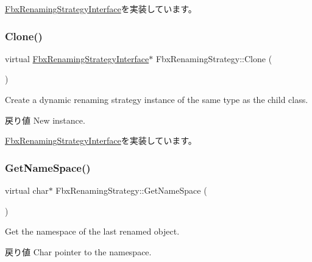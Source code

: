 \hyperlink{class_fbx_renaming_strategy_interface_a2090b5ae43936b617ec5d75015923f69}{Fbx\+Renaming\+Strategy\+Interface}を実装しています。

\mbox{\label{class_fbx_renaming_strategy_a36d1f3cc01ea460ab97d95fc8d8dd136}} 
\subsubsection{\texorpdfstring{Clone()}{Clone()}}
{\footnotesize\ttfamily virtual \hyperlink{class_fbx_renaming_strategy_interface}{Fbx\+Renaming\+Strategy\+Interface}$\ast$ Fbx\+Renaming\+Strategy\+::\+Clone (\begin{DoxyParamCaption}{ }\end{DoxyParamCaption})\hspace{0.3cm}{\ttfamily [virtual]}}

Create a dynamic renaming strategy instance of the same type as the child class. \begin{DoxyReturn}{戻り値}
New instance. 
\end{DoxyReturn}


\hyperlink{class_fbx_renaming_strategy_interface_ab394ed8a9b5d3ec40334bc933af83907}{Fbx\+Renaming\+Strategy\+Interface}を実装しています。

\mbox{\label{class_fbx_renaming_strategy_a52dcb44dfa0ee8e965aa81b0b233611a}} 
\subsubsection{\texorpdfstring{Get\+Name\+Space()}{GetNameSpace()}}
{\footnotesize\ttfamily virtual char$\ast$ Fbx\+Renaming\+Strategy\+::\+Get\+Name\+Space (\begin{DoxyParamCaption}{ }\end{DoxyParamCaption})\hspace{0.3cm}{\ttfamily [virtual]}}

Get the namespace of the last renamed object. \begin{DoxyReturn}{戻り値}
Char pointer to the namespace. 
\end{DoxyReturn}
\mbox{\label{class_fbx_renaming_strategy_a4908d6495b3749742c7b23c85f35ad93}} 
